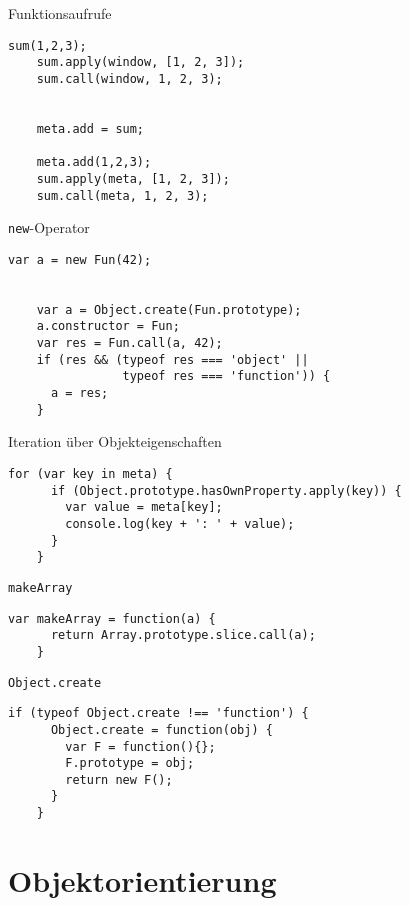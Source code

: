\begin{frame}[fragile]{Funktionsaufrufe}
  \begin{lstlisting}[gobble=4]
    sum(1,2,3);
    sum.apply(window, [1, 2, 3]);
    sum.call(window, 1, 2, 3);
    
    
    meta.add = sum;
    
    meta.add(1,2,3);
    sum.apply(meta, [1, 2, 3]);
    sum.call(meta, 1, 2, 3);
  \end{lstlisting}
\end{frame}

\begin{frame}[fragile]{\lstinline-new--Operator}
  \begin{lstlisting}[gobble=4]
    var a = new Fun(42);
  
  
    var a = Object.create(Fun.prototype);
    a.constructor = Fun;
    var res = Fun.call(a, 42);
    if (res && (typeof res === 'object' ||
                typeof res === 'function')) {
      a = res;
    }
  \end{lstlisting}
\end{frame}

\begin{frame}[fragile]{Iteration über Objekteigenschaften}
  \begin{lstlisting}[gobble=4,basicstyle=\small\ttfamily]
    for (var key in meta) {
      if (Object.prototype.hasOwnProperty.apply(key)) {
        var value = meta[key];
        console.log(key + ': ' + value);
      }
    }
  \end{lstlisting}
\end{frame}

\begin{frame}[fragile]{\lstinline-makeArray-}
  \begin{lstlisting}[gobble=4]
    var makeArray = function(a) {
      return Array.prototype.slice.call(a);
    }
  \end{lstlisting}  
\end{frame}

\begin{frame}[fragile]{\lstinline-Object.create-}
  \begin{lstlisting}[gobble=4]
    if (typeof Object.create !== 'function') {
      Object.create = function(obj) {
        var F = function(){};
        F.prototype = obj;
        return new F();
      }
    }
  \end{lstlisting}  
\end{frame}

\section{Objektorientierung}

